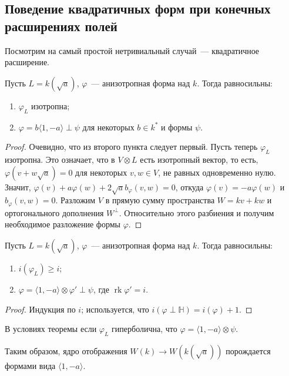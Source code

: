 \documentclass[a4paper,oneside,12pt]{article}
\theoremstyle{plain} { \swapnumbers
\newtheorem{theorem}{Теорема}[subsection]
\newtheorem{corollary}[theorem]{Следствие}
\newtheorem{lemma}[theorem]{Лемма}
\newtheorem{proposition}[theorem]{Утверждение}
\newtheorem{claim}[theorem]{Факт}
}
\theoremstyle{definition} { \swapnumbers
\newtheorem{definition}[theorem]{Определение}
\newtheorem{notation}[theorem]{Обозначение}
\newtheorem{remark}[theorem]{Замечание}
\newtheorem{remarks}[theorem]{Замечания}
\newtheorem{example}[theorem]{Пример}
\newtheorem{examples}[theorem]{Примеры}
\newtheorem{sssection}[theorem]{}
}
\def\ph{\varphi}
\def\la{\langle}
\def\ra{\rangle}
\def\rk{\operatorname{rk}}
\begin{document}
\subsection{Поведение квадратичных форм при конечных расширениях полей}

Посмотрим на самый простой нетривиальный случай~--- квадратичное расширение.
\begin{lemma}
Пусть $L=k(\sqrt{a})$, $\ph$~--- анизотропная форма над $k$. Тогда равносильны:
\begin{enumerate}
\item $\ph_L$ изотропна;
\item $\ph=b\la 1,-a\ra\perp\psi$ для некоторых $b\in k^*$ и формы $\psi$.
\end{enumerate}
\end{lemma}
\begin{proof}
Очевидно, что из второго пункта следует первый. Пусть теперь $\ph_L$ изотропна. Это означает,
что в $V\otimes L$ есть изотропный вектор, то есть, $\ph(v+w\sqrt{a})=0$ для некоторых
$v,w\in V$, не равных одновременно нулю. Значит, $\ph(v)+a\ph(w)+2\sqrt{a}b_\ph(v,w)=0$,
откуда $\ph(v)=-a\ph(w)$ и $b_\ph(v,w)=0$. Разложим $V$ в прямую сумму
пространства $W=kv+kw$ и ортогонального дополнения $W^\perp$. Относительно этого разбиения
и получим необходимое разложение формы $\ph$.
\end{proof}

\begin{theorem}
Пусть $L=k(\sqrt{a})$, $\ph$~--- анизотропная форма над $k$. Тогда равносильны:
\begin{enumerate}
\item $i(\ph_L)\geq i$;
\item $\ph=\la 1,-a\ra\otimes\ph'\perp\psi$, где $\rk\ph'=i$.
\end{enumerate}
\end{theorem}
\begin{proof}
Индукция по $i$; используется, что $i(\ph\perp\mathbb H)=i(\ph)+1$.
\end{proof}

\begin{corollary}
В условиях теоремы если $\ph_L$ гиперболична, что $\ph=\la 1,-a\ra\otimes\psi$.
\end{corollary}

Таким образом, ядро отображения $W(k)\to W(k(\sqrt{a}))$ порождается формами вида $\la 1,-a\ra$.
\end{document}

